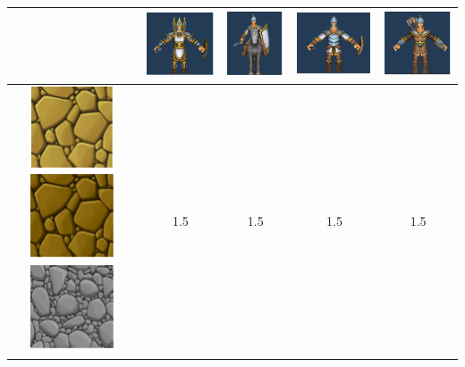 \begin{table}[H]
    \centering
    \begin{tabular}{|c|c|c|c|c|}
        \cline{2-5}        
        \multicolumn{1}{c|}{} & \includegraphics{imagesTable/infanteria} & \includegraphics{imagesTable/caballo} & \includegraphics{imagesTable/lancero} & \includegraphics{imagesTable/arquero} \\
        \hline
        \includegraphics{imagesTable/claroPiedra} \includegraphics{imagesTable/piedra} \includegraphics{imagesTable/grisPiedra} & 1.5 & 1.5 & 1.5 & 1.5 \\

\end{tabular}
\end{table}
